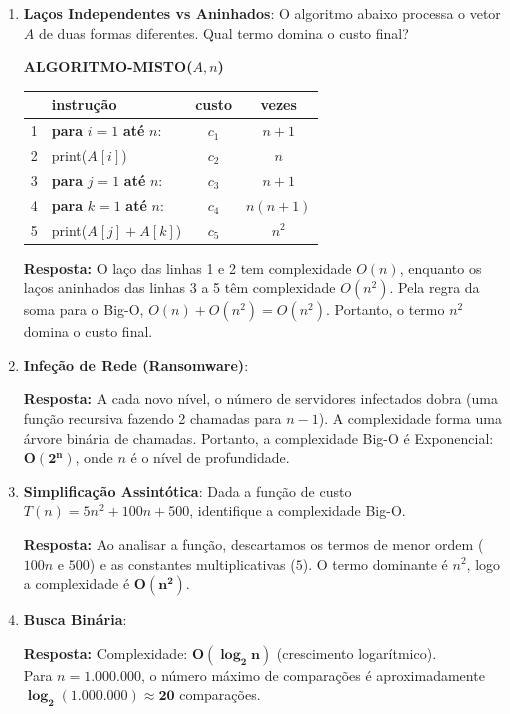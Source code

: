 \documentclass[12pt]{article}
\newcommand{\quadro}[1]{\vspace{0.2cm}\begin{tcolorbox}[colback=green!5, colframe=forestgreen, boxrule=0.5pt, arc=0pt] \textbf{Resposta:} #1 \end{tcolorbox}}
\begin{document}
\begin{enumerate}[label=\arabic*), leftmargin=1.5cm, itemsep=0.8cm]
    \item \textbf{Laços Independentes vs Aninhados}: O algoritmo abaixo processa o vetor $A$ de duas formas diferentes. Qual termo domina o custo final?

    \begin{tcolorbox}[colback=white, colframe=black, fontupper=\small]
        \textbf{ALGORITMO-MISTO($A, n$)} \\
        \begin{tabular}{llcc}
            \hline
            & \textbf{instrução} & \textbf{custo} & \textbf{vezes} \\
            \hline
            1 & \textbf{para} $i = 1$ \textbf{até} $n$: & $c_1$ & $n+1$ \\
            2 & \quad print($A[i]$) & $c_2$ & $n$ \\
            3 & \textbf{para} $j = 1$ \textbf{até} $n$: & $c_3$ & $n+1$ \\
            4 & \quad \textbf{para} $k = 1$ \textbf{até} $n$: & $c_4$ & $n(n+1)$ \\
            5 & \quad \quad print($A[j] + A[k]$) & $c_5$ & $n^2$ \\
            \hline
        \end{tabular}
    \end{tcolorbox}
    \quadro{O laço das linhas 1 e 2 tem complexidade $O(n)$, enquanto os laços aninhados das linhas 3 a 5 têm complexidade $O(n^2)$. Pela regra da soma para o Big-O, $O(n) + O(n^2) = O(n^2)$. Portanto, o termo $n^2$ domina o custo final.}

    \item \textbf{Infeção de Rede (Ransomware)}: 
    \quadro{A cada novo nível, o número de servidores infectados dobra (uma função recursiva fazendo 2 chamadas para $n-1$). A complexidade forma uma árvore binária de chamadas. Portanto, a complexidade Big-O é Exponencial: $\mathbf{O(2^n)}$, onde $n$ é o nível de profundidade.}
    
    \item \textbf{Simplificação Assintótica}: Dada a função de custo $T(n) = 5n^2 + 100n + 500$, identifique a complexidade Big-O.
    \quadro{Ao analisar a função, descartamos os termos de menor ordem ($100n$ e $500$) e as constantes multiplicativas ($5$). O termo dominante é $n^2$, logo a complexidade é $\mathbf{O(n^2)}$.}

    \item \textbf{Busca Binária}: 
    \quadro{Complexidade: $\mathbf{O(\log_2 n)}$ (crescimento logarítmico). \\ Para $n = 1.000.000$, o número máximo de comparações é aproximadamente $\mathbf{\log_2(1.000.000) \approx 20}$ comparações.}


\end{enumerate}
\end{document}
